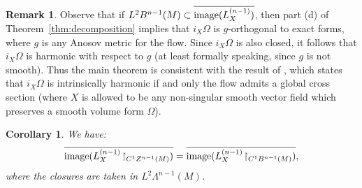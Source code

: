 \documentclass[11pt,letterpaper,reqno,abstract=true]{scrartcl}
\theoremstyle{plain}                              %
\newtheorem{cor}[thm]{Corollary}
\theoremstyle{definition}                         %
\newtheorem*{remark}{Remark}
\theoremstyle{remark}                             %
\newcommand{\restrict}{\upharpoonright}
\begin{document}
\begin{remark}
  Observe that if
  $L^2 B^{n-1}(M) \subset \overline{\text{image}(\normalfont
    L_X^{(n-1)})}$, then part (d) of Theorem~\ref{thm:decomposition}
  implies that $i_X \Omega$ is $g$-orthogonal to exact forms, where
  $g$ is any Anosov metric for the flow. Since $i_X \Omega$ is also
  closed, it follows that $i_X \Omega$ is harmonic with respect to $g$
  (at least formally speaking, since $g$ is not smooth). Thus the main
  theorem is consistent with the result of \cite{simic+23}, which
  states that $i_X \Omega$ is intrinsically harmonic if and only the
  flow admits a global cross section (where $X$ is allowed to be any
  non-singular smooth vector field which preserves a smooth volume
  form $\Omega$).
\end{remark}



\begin{cor}
  We have:
  \begin{displaymath}
    \overline{\text{\normalfont image}( L_X^{(n-1)} \! \restrict_{C^1
        Z^{n-1}(M)})} = \overline{\text{\normalfont image}(
      L_X^{(n-1)} \! \restrict_{C^1 B^{n-1}(M)})},
  \end{displaymath}
  where the closures are taken in $L^2 \Lambda^{n-1}(M)$.
\end{cor}
\end{document}
